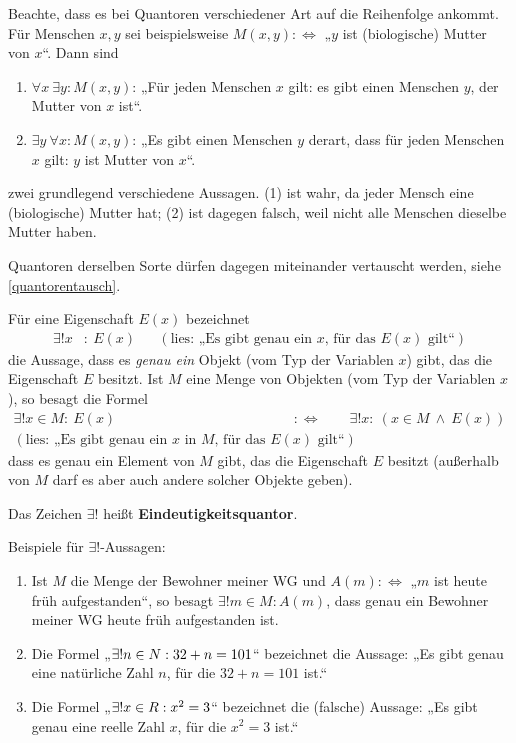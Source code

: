  
\begin{bem} \label{quantorreihenfolge}
    Beachte, dass es bei Quantoren verschiedener Art auf die Reihenfolge ankommt. Für Menschen $x,y$ sei beispielsweise $M(x,y):\Leftrightarrow$ „$y$ ist (biologische) Mutter von $x$“. Dann sind
    \begin{enumerate}[(1)]
        \item $\forall x\ \exists y: M(x,y)$: „Für jeden Menschen $x$ gilt: es gibt einen Menschen $y$, der Mutter von $x$ ist“.
        \item $\exists y\ \forall x: M(x,y)$: „Es gibt einen Menschen $y$ derart, dass für jeden Menschen $x$ gilt: $y$ ist Mutter von $x$“.
    \end{enumerate}
    zwei grundlegend verschiedene Aussagen. (1) ist wahr, da jeder Mensch eine (biologische) Mutter hat; (2) ist dagegen falsch, weil nicht alle Menschen dieselbe Mutter haben.
    
    Quantoren derselben Sorte dürfen dagegen miteinander vertauscht werden, siehe \cref{quantorentausch}.
\end{bem}


\begin{defin} \label{def:eindquant}
    Für eine Eigenschaft $E(x)$ bezeichnet
    \begin{align*}
        \exists ! x& :\ E(x) && (\text{lies: „Es gibt genau ein $x$, für das $E(x)$ gilt“})
    \end{align*}
    die Aussage, dass es \emph{genau ein} Objekt (vom Typ der Variablen $x$) gibt, das die Eigenschaft $E$ besitzt. Ist $M$ eine Menge von Objekten (vom Typ der Variablen $x$), so besagt die Formel
    \begin{align*}
        \exists ! x\in M :\ E(x) \qquad &:\Leftrightarrow\qquad \exists ! x:\ (x\in M\ \land\ E(x)) \\
        (\text{lies: „Es gibt genau ein $x$ in $M$, für das $E(x)$ gilt“})
    \end{align*}
    dass es genau ein Element von $M$ gibt, das die Eigenschaft $E$ besitzt (außerhalb von $M$ darf es aber auch andere solcher Objekte geben).
    
    Das Zeichen $\exists !$ heißt \textbf{Eindeutigkeitsquantor}.
\end{defin}


\begin{bsp}
    Beispiele für $\exists !$-Aussagen:
    \begin{enumerate}
        \item Ist $M$ die Menge der Bewohner meiner WG und $A(m):\Leftrightarrow$ „$m$ ist heute früh aufgestanden“, so besagt $\exists ! m\in M: A(m)$, dass genau ein Bewohner meiner WG heute früh aufgestanden ist.
        \item Die Formel „$\exists ! n\in \relax N : 32+n = 101$“ bezeichnet die Aussage: „Es gibt genau eine natürliche Zahl $n$, für die $32+n=101$ ist.“
        \item Die Formel „$\exists ! x\in \relax R: x^2=3$“ bezeichnet die (falsche) Aussage: „Es gibt genau eine reelle Zahl $x$, für die $x^2=3$ ist.“
    \end{enumerate}
\end{bsp}


